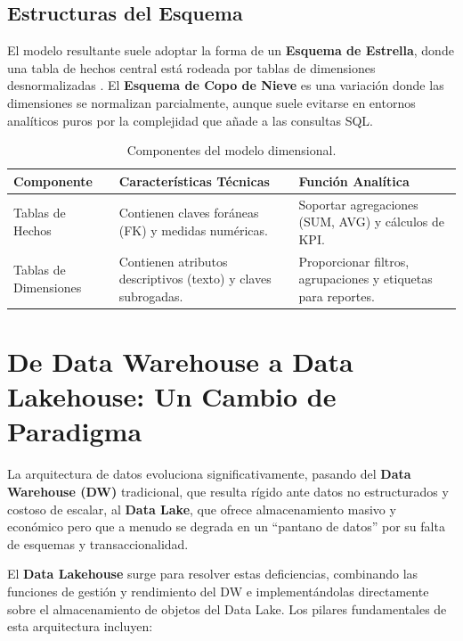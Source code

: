 \subsection{Estructuras del Esquema}

El modelo resultante suele adoptar la forma de un \textbf{Esquema de Estrella}, donde una tabla de hechos central está rodeada por tablas de dimensiones desnormalizadas \parencite{kimball2013data}. El \textbf{Esquema de Copo de Nieve} es una variación donde las dimensiones se normalizan parcialmente, aunque suele evitarse en entornos analíticos puros por la complejidad que añade a las consultas SQL.

\begin{table}[H]
    \caption{Componentes del modelo dimensional.}
    \label{tab:modelo-dimensional}
    \centering
    \begin{tabular}{p{4cm} p{5.5cm} p{5.5cm}}
        \toprule
        \textbf{Componente} & \textbf{Características Técnicas} & \textbf{Función Analítica} \\
        \midrule
        Tablas de Hechos & Contienen claves foráneas (FK) y medidas numéricas. & Soportar agregaciones (SUM, AVG) y cálculos de KPI. \\
        Tablas de Dimensiones & Contienen atributos descriptivos (texto) y claves subrogadas. & Proporcionar filtros, agrupaciones y etiquetas para reportes. \\
        \bottomrule
    \end{tabular}
\end{table}


\section{De Data Warehouse a Data Lakehouse: Un Cambio de Paradigma}

La arquitectura de datos evoluciona significativamente, pasando del \textbf{Data Warehouse (DW)} tradicional, que resulta rígido ante datos no estructurados y costoso de escalar, al \textbf{Data Lake}, que ofrece almacenamiento masivo y económico pero que a menudo se degrada en un ``pantano de datos'' por su falta de esquemas y transaccionalidad.

El \textbf{Data Lakehouse} surge para resolver estas deficiencias, combinando las funciones de gestión y rendimiento del DW e implementándolas directamente sobre el almacenamiento de objetos del Data Lake. Los pilares fundamentales de esta arquitectura incluyen:

